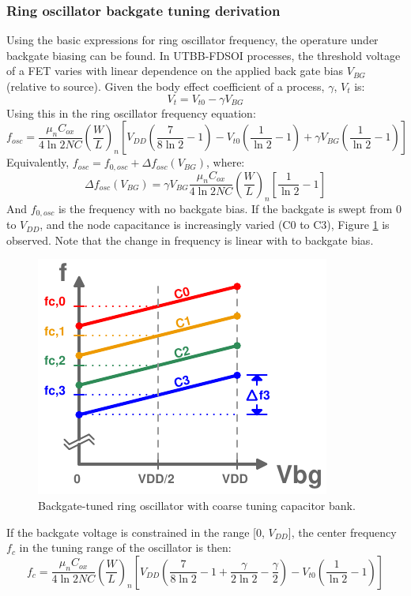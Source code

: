 	\subsubsection{Ring oscillator backgate tuning derivation}
		Using the basic expressions for ring oscillator frequency, the operature under backgate biasing can be found. In UTBB-FDSOI processes, the threshold voltage of a FET varies with linear dependence on the applied back gate bias $V_{BG}$ (relative to source). Given the body effect coefficient of a process, $\gamma$, $V_t$ is:
		\begin{equation}
			V_t = V_{t0} - \gamma V_{BG}
		\end{equation}
		Using this in the ring oscillator frequency equation:
		\begin{equation}
			f_{osc} = \frac{\mu_nC_{ox}}{4\ln2NC}\left(\frac{W}{L}\right)_n\left[V_{DD}\left(\frac{7}{8\ln2}-1\right)-V_{t0}\left(\frac{1}{\ln2}-1\right) + \gamma V_{BG}\left(\frac{1}{\ln2}-1\right) \right]
		\end{equation}
		Equivalently, $f_{osc} = f_{0,osc} + \Delta f_{osc}(V_{BG})$, where:
		\begin{equation}
			\Delta f_{osc}(V_{BG}) = \gamma V_{BG}\frac{\mu_nC_{ox}}{4\ln2NC}\left(\frac{W}{L}\right)_n\left[\frac{1}{\ln2}-1\right]
		\end{equation}	
		And $f_{0,osc}$ is the frequency with no backgate bias. If the backgate is swept from 0 to $V_{DD}$, and the node capacitance is increasingly varied (C0 to C3), Figure \ref{fig:rosc_tuning} is observed. Note that the change in frequency is linear with to backgate bias.
		\FloatBarrier
		\begin{figure}[htb!]
			\center\includegraphics[width=0.3\linewidth, angle=0]{figs/backgate_rosc_tuning2.pdf}
			\caption{Backgate-tuned ring oscillator with coarse tuning capacitor bank.}
			\label{fig:rosc_tuning}
		\end{figure}
		If the backgate voltage is constrained in the range [0, $V_{DD}$], the center frequency $f_c$ in the tuning range of the oscillator is then:
		\begin{equation}
			f_{c} = \frac{\mu_nC_{ox}}{4\ln2NC}\left(\frac{W}{L}\right)_n\left[V_{DD}\left(\frac{7}{8\ln2}-1+\frac{\gamma}{2\ln2}-\frac{\gamma}{2}\right)-V_{t0}\left(\frac{1}{\ln2}-1\right)\right]
		\end{equation}
